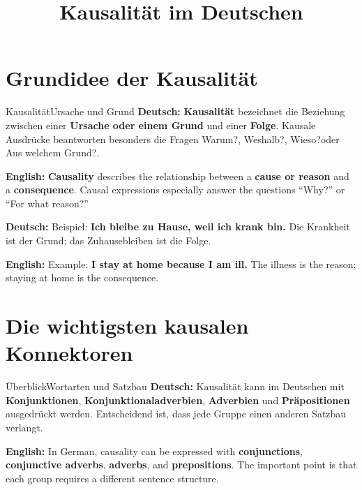 \documentclass[a4paper,11pt]{article}
\title{Kausalität im Deutschen}
\date{}
\newcommand{\GermanText}[1]{\textbf{Deutsch: }#1\par}
\newcommand{\EnglishText}[1]{{\small\color{SoftGray}\textbf{English: }#1\par}}
\begin{document}
    \maketitle
    \tableofcontents
    \newpage

    \section{Grundidee der Kausalität}

        \begin{grammarentry}{Kausalität}{Ursache und Grund}
            \GermanText{\textbf{Kausalität} bezeichnet die Beziehung zwischen einer \textbf{Ursache oder einem Grund} und einer \textbf{Folge}. Kausale Ausdrücke beantworten besonders die Fragen \glqq Warum?\grqq, \glqq Weshalb?\grqq, \glqq Wieso?\grqq oder \glqq Aus welchem Grund?\grqq.}
            \EnglishText{\textbf{Causality} describes the relationship between a \textbf{cause or reason} and a \textbf{consequence}. Causal expressions especially answer the questions ``Why?'' or ``For what reason?''}

            \GermanText{Beispiel: \textbf{Ich bleibe zu Hause, weil ich krank bin.} Die Krankheit ist der Grund; das Zuhausebleiben ist die Folge.}
            \EnglishText{Example: \textbf{I stay at home because I am ill.} The illness is the reason; staying at home is the consequence.}
        \end{grammarentry}

    \section{Die wichtigsten kausalen Konnektoren}

        \begin{grammarentry}{Überblick}{Wortarten und Satzbau}
            \GermanText{Kausalität kann im Deutschen mit \textbf{Konjunktionen}, \textbf{Konjunktionaladverbien}, \textbf{Adverbien} und \textbf{Präpositionen} ausgedrückt werden. Entscheidend ist, dass jede Gruppe einen anderen Satzbau verlangt.}
            \EnglishText{In German, causality can be expressed with \textbf{conjunctions}, \textbf{conjunctive adverbs}, \textbf{adverbs}, and \textbf{prepositions}. The important point is that each group requires a different sentence structure.}
        \end{grammarentry}
\end{document}
